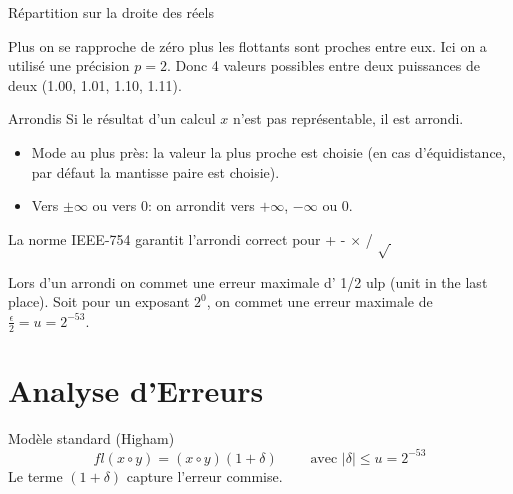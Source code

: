 \documentclass{beamer}
\begin{document}
\begin{frame}{Répartition sur la droite des réels}

    Plus on se rapproche de zéro plus les flottants sont proches entre eux.
    Ici on a utilisé une précision $p=2$. Donc 4 valeurs possibles entre deux puissances de deux (1.00, 1.01, 1.10, 1.11).
\end{frame}


\begin{frame}{Arrondis}
    Si le résultat d'un calcul $x$ n'est pas représentable, il est arrondi.
    \begin{itemize}
        \item Mode au plus près: la valeur la plus proche est choisie (en cas d'équidistance, par défaut la mantisse paire est choisie).
        \item Vers $\pm\infty$ ou vers $0$: on arrondit vers $+\infty$, $-\infty$ ou $0$.
    \end{itemize}

    La norme IEEE-754 garantit l'arrondi correct pour + - $\times$ / $\sqrt{\,}$

    Lors d'un arrondi on commet une erreur maximale d' 1/2 ulp (unit in the last place).
    Soit pour un exposant $2^{0}$, on commet une erreur maximale de $\frac{\epsilon}{2} = u = 2^{-53}$.
\end{frame}

\section{Analyse d'Erreurs}
\begin{frame}{Modèle standard (Higham)}
    \[ fl(x \circ y ) = (x \circ y)(1+\delta) \qquad \text{ avec } |\delta| \le u = 2^{-53} \]
    \vfill{}
    Le terme $(1+\delta)$ capture l'erreur commise.
\end{frame}
\end{document}

